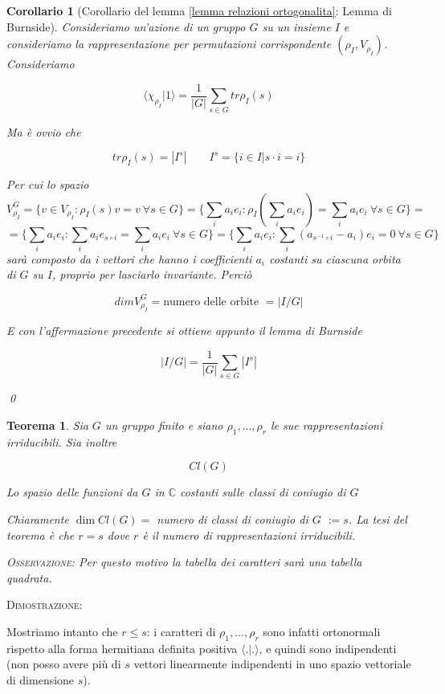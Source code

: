 \documentclass[11pt]{article}
\theoremstyle{plain}
\newtheorem{thm}{Teorema}[section]
\newtheorem*{cor}{Corollario}
\theoremstyle{definition}
\theoremstyle{remark}
\newcommand{\C}{\mathbb{C}}
\newcommand{\dsum}{\displaystyle\sum}
\begin{document}
\begin{cor}[Corollario del lemma \ref{lemma relazioni ortogonalita}: Lemma di Burnside]

Consideriamo un'azione di un gruppo $G$ su un insieme $I$ e consideriamo la rappresentazione per permutazioni corrispondente $(\rho_I, V_{\rho_I})$. Consideriamo

\[\langle \chi_{\rho_I} | 1 \rangle = \dfrac{1}{|G|} \dsum_{s\in G} tr \rho_I(s)\]

Ma è ovvio che 

\[tr \rho_I(s) = |I^s| \qquad I^s = \{ i \in I | s \cdot i = i\} \]

Per cui lo spazio 
\[V_{\rho_I}^G = \{v\in V_{\rho_I}:\rho_I(s)v=v\ \forall s\in G\}=\{\sum_i a_i e_i :\rho_I(\sum_i a_i e_i)=\sum_i a_i e_i\ \forall s\in G\}=\]
\[ =\{\sum_i a_i e_i :\sum_i a_i e_{s\circ i}=\sum_i a_i e_i\ \forall s\in G\}=\{ \sum_i a_i e_i: \sum_i (a_{s^{-1}\circ i}-a_i)e_i=0\ \forall s\in G \}\]
sarà composto da i vettori che hanno i coefficienti $a_i$ costanti su ciascuna orbita di $G$ su $I$, proprio per lasciarlo invariante. Perciò 

\[ dimV_{\rho_I}^G = \text{numero delle orbite } = |I/G|\]

E con l'affermazione precedente si ottiene appunto il lemma di Burnside

\[ |I/G| = \dfrac{1}{|G|} \dsum_{s\in G} |I^s|\]

\qed
\end{cor}






\begin{thm} Sia $G$ un gruppo finito e siano $\rho_1, \ldots , \rho_r$ le sue rappresentazioni irriducibili. Sia inoltre 

\[Cl(G)  \]

Lo spazio delle funzioni da $G$ in $\C$ costanti sulle classi di coniugio di $G$

Chiaramente $\dim Cl(G) = $ numero di classi di coniugio di $G$ $:= s$. La tesi del teorema è che $r = s$ 
dove $r$ è il numero di rappresentazioni irriducibili. 

\textsc{Osservazione:} Per questo motivo la tabella dei caratteri sarà una tabella quadrata.

\end{thm}

\textsc{Dimostrazione:}
 
Mostriamo intanto che $r \leq s$: i caratteri di $\rho_1, \ldots , \rho_r$ sono infatti ortonormali rispetto alla forma hermitiana
definita positiva $\langle . | .\rangle$, e quindi sono indipendenti (non posso avere più di $s$ vettori linearmente indipendenti 
in uno spazio vettoriale di dimensione $s$).
\end{document}
